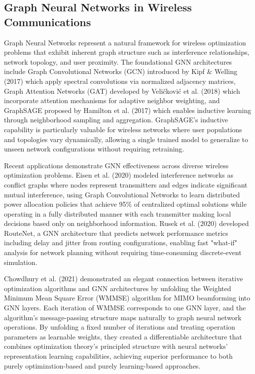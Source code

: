 \subsection{Graph Neural Networks in Wireless Communications}

Graph Neural Networks represent a natural framework for wireless optimization problems that exhibit inherent graph structure such as interference relationships, network topology, and user proximity. The foundational GNN architectures include Graph Convolutional Networks (GCN) introduced by Kipf & Welling (2017) which apply spectral convolutions via normalized adjacency matrices, Graph Attention Networks (GAT) developed by Veličković et al. (2018) which incorporate attention mechanisms for adaptive neighbor weighting, and GraphSAGE proposed by Hamilton et al. (2017) which enables inductive learning through neighborhood sampling and aggregation. GraphSAGE's inductive capability is particularly valuable for wireless networks where user populations and topologies vary dynamically, allowing a single trained model to generalize to unseen network configurations without requiring retraining.

Recent applications demonstrate GNN effectiveness across diverse wireless optimization problems. Eisen et al. (2020) modeled interference networks as conflict graphs where nodes represent transmitters and edges indicate significant mutual interference, using Graph Convolutional Networks to learn distributed power allocation policies that achieve 95\% of centralized optimal solutions while operating in a fully distributed manner with each transmitter making local decisions based only on neighborhood information. Rusek et al. (2020) developed RouteNet, a GNN architecture that predicts network performance metrics including delay and jitter from routing configurations, enabling fast "what-if" analysis for network planning without requiring time-consuming discrete-event simulation.

Chowdhury et al. (2021) demonstrated an elegant connection between iterative optimization algorithms and GNN architectures by unfolding the Weighted Minimum Mean Square Error (WMMSE) algorithm for MIMO beamforming into GNN layers. Each iteration of WMMSE corresponds to one GNN layer, and the algorithm's message-passing structure maps naturally to graph neural network operations. By unfolding a fixed number of iterations and treating operation parameters as learnable weights, they created a differentiable architecture that combines optimization theory's principled structure with neural networks' representation learning capabilities, achieving superior performance to both purely optimization-based and purely learning-based approaches.

